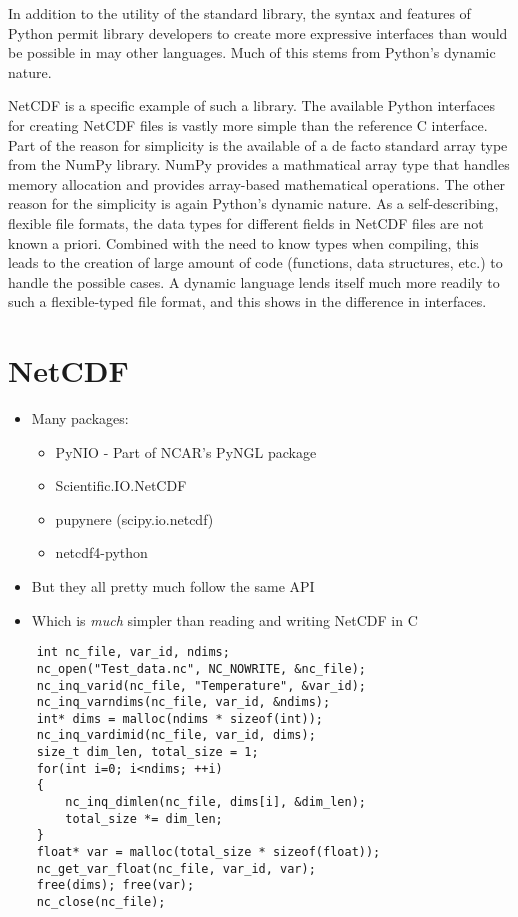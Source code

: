 \documentclass[twocolumn]{article}
\begin{document}
In addition to the utility of the standard library, the syntax and features of Python
permit library developers to create more expressive interfaces than would be possible
in may other languages. Much of this stems from Python's dynamic nature.

NetCDF is a specific example of such a library. The available Python interfaces for creating
NetCDF files is vastly more simple than the reference C interface. Part of the reason for
simplicity is the available of a de facto standard array type from the NumPy library. NumPy
provides a mathmatical array type that handles memory allocation and provides array-based
mathematical operations. The other reason for the simplicity is again Python's dynamic nature.
As a self-describing, flexible file formats, the data types for different fields in NetCDF
files are not known a priori. Combined with the need to know types when compiling, this
leads to the creation of large amount of code (functions, data structures, etc.) to handle
the possible cases.  A dynamic language lends itself much more readily to such a flexible-typed
file format, and this shows in the difference in interfaces.


\section{NetCDF}
  \begin{itemize}
    \item Many packages:
    \begin{itemize}
      \item PyNIO - Part of NCAR's PyNGL package
      \item Scientific.IO.NetCDF
      \item pupynere (scipy.io.netcdf)
      \item netcdf4-python
    \end{itemize}
    \item But they all pretty much follow the same API
    \item Which is \emph{much} simpler than reading and writing NetCDF in C
  \end{itemize}

  \lstset{language=C}
  \begin{lstlisting}
    int nc_file, var_id, ndims;
    nc_open("Test_data.nc", NC_NOWRITE, &nc_file);
    nc_inq_varid(nc_file, "Temperature", &var_id);
    nc_inq_varndims(nc_file, var_id, &ndims);
    int* dims = malloc(ndims * sizeof(int));
    nc_inq_vardimid(nc_file, var_id, dims);
    size_t dim_len, total_size = 1;
    for(int i=0; i<ndims; ++i)
    {
        nc_inq_dimlen(nc_file, dims[i], &dim_len);
        total_size *= dim_len;
    }
    float* var = malloc(total_size * sizeof(float));
    nc_get_var_float(nc_file, var_id, var);
    free(dims); free(var);
    nc_close(nc_file);
  \end{lstlisting}
\end{document}
